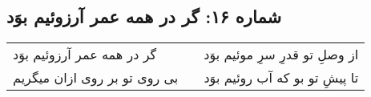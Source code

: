 \begin{center}
\section*{شماره ۱۶: گر در همه عمر آرزوئیم بوَد}
\label{sec:016}
\begin{longtable}{l p{0.5cm} r}
گر در همه عمر آرزوئیم بوَد
&&
از وصلِ تو قدرِ سرِ موئیم بوَد
\\
بی روی تو بر روی ازان میگریم
&&
تا پیشِ تو بو که آب روئیم بوَد
\\
\end{longtable}
\end{center}
